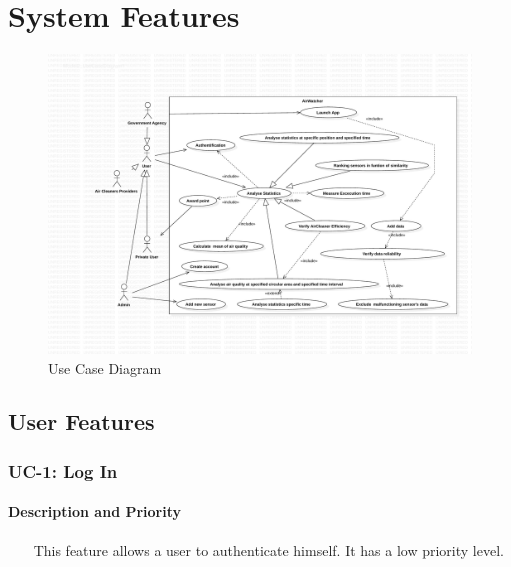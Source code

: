 \documentclass{report}
\begin{document}
\chapter{System Features}
\begin{figure}[H]
	\begin{center}
		\includegraphics[scale=0.55]{uc.pdf}
	\end{center}
	\caption{Use Case Diagram}
	\label{fig:uc}
\end{figure}

\section{User Features}

\subsection{UC-1: Log In}

\subsubsection*{Description and Priority} ~~~
This feature allows a user to authenticate himself.
It has a low priority level.
\end{document}
